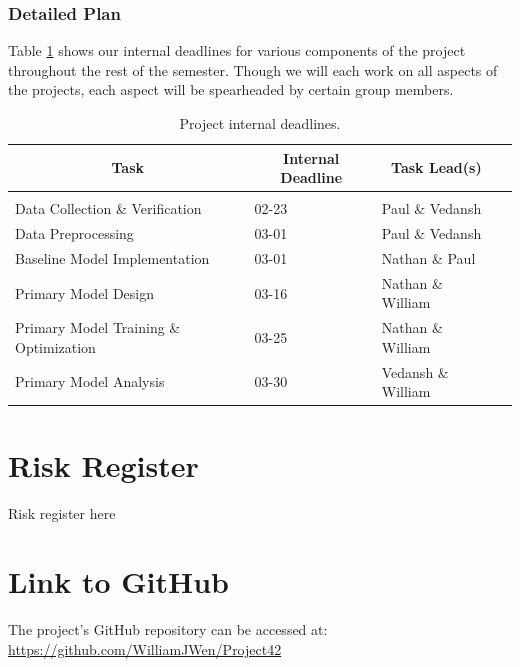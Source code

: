 \documentclass{article} %
\begin{document}
\subsubsection{Detailed Plan}
\label{detailed_plan}

Table \ref{plan_table} shows our internal deadlines for various components of the project throughout the rest of the semester. Though we will each work on all aspects of the projects, each aspect will be spearheaded by certain group members.

    \begin{table}[t]
    \caption{Project internal deadlines.}
    \label{plan_table}
    \begin{center}
    \begin{tabular}{llll}
    \multicolumn{1}{c}{\bf Task}            & \multicolumn{1}{c}{\bf Internal Deadline} & \multicolumn{1}{c}{\bf Task Lead(s)}
    \\ \hline \\
    Data Collection \& Verification         & 02-23                                     & Paul \& Vedansh \\
    Data Preprocessing                      & 03-01                                     & Paul \& Vedansh \\
    Baseline Model Implementation           & 03-01                                     & Nathan \& Paul \\                   
    Primary Model Design                    & 03-16                                     & Nathan \& William \\
    Primary Model Training \& Optimization  & 03-25                                     & Nathan \& William \\
    Primary Model Analysis                  & 03-30                                     & Vedansh \& William \\
    \end{tabular}
    \end{center}
    \end{table}
    

\section{Risk Register}
\label{risk}

Risk register here

\section{Link to GitHub}
The project's GitHub repository can be accessed at:  
\href{https://github.com/WilliamJWen/Project42}{https://github.com/WilliamJWen/Project42}


\label{last_page}



\end{document}
